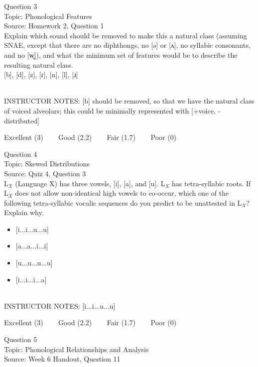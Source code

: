 \documentclass[12pt]{article}
\begin{document}
{\large Question 3}\\

Topic: Phonological Features\\
Source: Homework 2, Question 1\\

Explain which sound should be removed to make this a natural class (assuming SNAE, except that there are no diphthongs, no [ə] or [ʌ], no syllabic consonants, and no [w̥]), and what the minimum set of features would be to describe the resulting natural class.\\

{[b]}, {[d]}, {[z]}, {[ɾ]}, {[n]}, {[l]}, {[ɹ]}


~\\
INSTRUCTOR NOTES: [b] should be removed, so that we have the natural class of voiced alveolars; this could be minimally represented with [+voice, -distributed]


\vfill
Excellent (3) ~~~ Good (2.2) ~~~ Fair (1.7) ~~~ Poor (0)
\newpage

{\large Question 4}\\

Topic: Skewed Distributions\\
Source: Quiz 4, Question 3\\

L$_X$ (Language X) has three vowels, [i], [a], and [u]. L$_X$ has tetra-syllabic roots. If L$_X$ does not allow non-identical high vowels to co-occur, which one of the following tetra-syllabic vocalic sequences do you predict to be unattested in L$_X$? Explain why.\\

\begin{itemize} \item {[i...i...u...u]} \item {[a...a...i...i]} \item {[u...u...u...u]} \item {[i...i...i...a]} \end{itemize}


~\\
INSTRUCTOR NOTES: [i...i...u...u]


\vfill
Excellent (3) ~~~ Good (2.2) ~~~ Fair (1.7) ~~~ Poor (0)
\newpage

{\large Question 5}\\

Topic: Phonological Relationships and Analysis\\
Source: Week 6 Handout, Question 11\\
\end{document}

